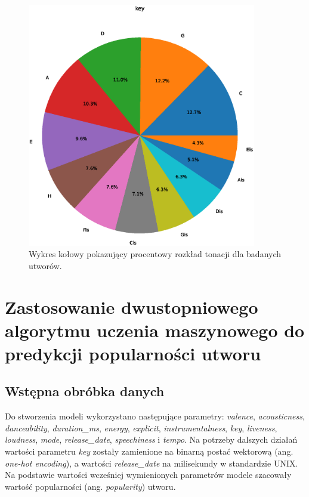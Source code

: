\documentclass[a4paper,12pt]{article}
\numberwithin{figure}{section}
\begin{document}
    \smallskip

    \begin{figure}[H]
        \centering
        \includegraphics[width=10cm,keepaspectratio]{key}
        \caption{Wykres kołowy pokazujący procentowy rozkład tonacji dla badanych utworów.}
        \label{fig:key}
    \end{figure}

    \newpage


    \section{Zastosowanie dwustopniowego algorytmu uczenia maszynowego do predykcji popularności utworu}

    \subsection{Wstępna obróbka danych}

    Do stworzenia modeli wykorzystano następujące parametry: \textit{valence}, \textit{acousticness}, \textit{danceability}, \textit{duration\_ms}, \textit{energy}, \textit{explicit}, \textit{instrumentalness}, \textit{key}, \textit{liveness}, \textit{loudness}, \textit{mode}, \textit{release\_date}, \textit{speechiness} i \textit{tempo}. Na potrzeby dalszych działań wartości parametru \textit{key} zostały zamienione na binarną postać wektorową (ang. \textit{one-hot encoding}), a wartości \textit{release\_date} na milisekundy w standardzie UNIX. Na podstawie wartości wcześniej wymienionych parametrów modele szacowały wartość popularności (ang. \textit{popularity}) utworu.
\end{document}
